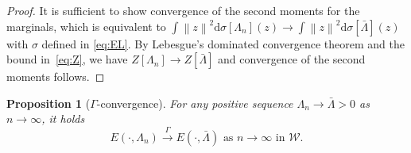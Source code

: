 \documentclass[11pt,a4paper,final]{article}
\newcommand{\Wass}{\mathscr{W}}
\renewcommand{\d}{\mathrm{d}}
\newcommand{\norm}[1]{\left\lVert#1\right\rVert}
\newcommand{\1}{\mathbf{1}}
\theoremstyle{plain}
\newtheorem{proposition}[theorem]{Proposition}
\numberwithin{equation}{section}
\numberwithin{theorem}{section}
\begin{document}
\begin{proof}
It is sufficient to show convergence of the second moments for the marginals, which is equivalent to $\int \norm{z}^2\d\sigma[\Lambda_n](z)\to \int \norm{z}^2\d\sigma[\bar\Lambda](z)$ with $\sigma$ defined in \eqref{eq:EL}. By Lebesgue's dominated convergence theorem and the bound in~\eqref{eq:Z}, %
we have $Z[\Lambda_n]\to Z[\bar\Lambda]$ and convergence of the second moments follows.
\end{proof}
\begin{proposition}[$\Gamma$-convergence]\label{prop:gamma_cv}
   For any positive sequence $\Lambda_n \rightarrow \bar \Lambda>0$  as $n\rightarrow \infty$, it holds
   $$E(\cdot,\Lambda_n) \overset{\Gamma}{\rightarrow} E(\cdot,\bar \Lambda) \text{ as } n\rightarrow \infty \text{ in } \Wass.$$ 
\end{proposition}
\end{document}

